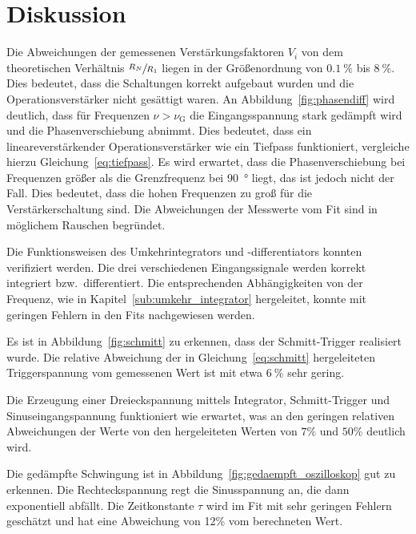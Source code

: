 \section{Diskussion}%
\label{sec:diskussion}


Die Abweichungen der gemessenen Verstärkungsfaktoren $V_i$
von dem theoretischen Verhältnis $\sfrac{R_N}{R_1}$ liegen
in der Größenordnung von $\SI{0.1}{\percent}$ bis $\SI{8}{\percent}$.
Dies bedeutet, dass die Schaltungen korrekt aufgebaut wurden und die Operationsverstärker nicht gesättigt waren.
An Abbildung~\ref{fig:phasendiff} wird deutlich,
dass für Frequenzen $\nu > \nu_\text{G}$
die Eingangsspannung stark gedämpft wird und die Phasenverschiebung abnimmt.
Dies bedeutet, dass ein lineareverstärkender Operationsverstärker wie ein Tiefpass funktioniert, vergleiche hierzu Gleichung~\eqref{eq:tiefpass}.
Es wird erwartet, dass die Phasenverschiebung bei Frequenzen größer als die Grenzfrequenz bei
\SI{90}{\degree} liegt, das ist jedoch nicht der Fall.
Dies bedeutet, dass die hohen Frequenzen zu groß für die Verstärkerschaltung sind.
Die Abweichungen der Messwerte vom Fit sind in möglichem Rauschen begründet.


Die Funktionsweisen des Umkehrintegrators und -differentiators konnten verifiziert werden.
Die drei verschiedenen Eingangssignale werden korrekt integriert bzw.\ differentiert.
Die entsprechenden Abhängigkeiten von der Frequenz, wie in Kapitel~\ref{sub:umkehr_integrator} hergeleitet,
konnte mit geringen Fehlern in den Fits nachgewiesen werden.

Es ist in Abbildung~\ref{fig:schmitt} zu erkennen,
dass der Schmitt-Trigger realisiert wurde.
Die relative Abweichung der in Gleichung~\eqref{eq:schmitt}
hergeleiteten Triggerspannung vom gemessenen Wert ist
mit etwa $\SI{6}{\percent}$ sehr gering.

Die Erzeugung einer Dreieckspannung mittels Integrator, Schmitt-Trigger und Sinuseingangspannung
funktioniert wie erwartet,
was an den geringen relativen Abweichungen der Werte von den hergeleiteten Werten von $7\%$ und $50\%$ deutlich wird.

Die gedämpfte Schwingung ist in Abbildung~\ref{fig:gedaempft_oszilloskop}
gut zu erkennen.
Die Rechteckspannung regt die Sinusspannung an,
die dann exponentiell abfällt.
Die Zeitkonstante $\tau$ wird im Fit mit sehr geringen Fehlern geschätzt
und hat eine Abweichung von \num{12}\% vom berechneten Wert.
